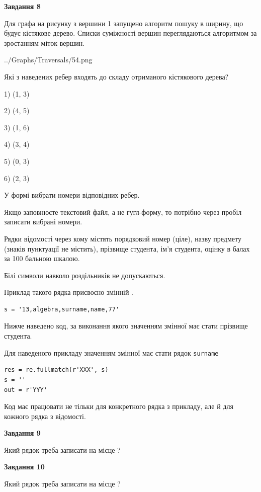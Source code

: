 \documentclass[12pt, ukrainian]{article}
\def\code#1{\Verb!#1!}
\begin{document}
{\begin {large}
{\begin {center}\textbf{Завдання 8}\end {center}}\par
Для графа на рисунку з вершини 1 запущено алгоритм пошуку в ширину, що будує кістякове дерево. Списки суміжності вершин переглядаються алгоритмом за зростанням міток вершин.\par
\begin{center}
	{../Graphs/Traversals/54.png}
\end{center}
\par Які з наведених ребер входять до складу отриманого кістякового дерева?\par
1) (1, 3)\par
2) (4, 5)\par
3) (1, 6)\par
4) (3, 4)\par
5) (0, 3)\par
6) (2, 3)\par
{\vskip 15pt} У формі вибрати номери відповідних ребер.


Якщо заповнюєте текстовий файл, а не гугл-форму, то потрібно через пробіл записа\-ти вибрані номери.\par
\newpage


Рядки відомості через кому містять порядковий номер (ціле), назву предмету (зна\-ків пунктуації не містить), прізвище студента, ім'я студента, оцінку в балах за 100 бальною шкалою.

Білі символи навколо роздільників не допускаються.

Приклад такого рядка присвоєно змінній .



\begin{verbatim}
s = '13,algebra,surname,name,77'
\end{verbatim}


Нижче наведено код, за виконання якого значенням змінної  має стати прізвище студента.

Для наведеного прикладу значенням змінної  має стати рядок \code{surname}



\begin{verbatim}
res = re.fullmatch(r'XXX', s)
s = ''
out = r'YYY'
\end{verbatim}


Код має працювати не тільки для конкретного рядка з прикладу, але й для кожного рядка з відомості.

{\begin {center}\textbf{Завдання 9}\end {center}}\par
Який рядок треба записати на місце  ?\par
\vspace{5mm}


{\begin {center}\textbf{Завдання 10}\end {center}}\par
Який рядок треба записати на місце  ?\par


\newpage


\end {large}}
\end{document}
